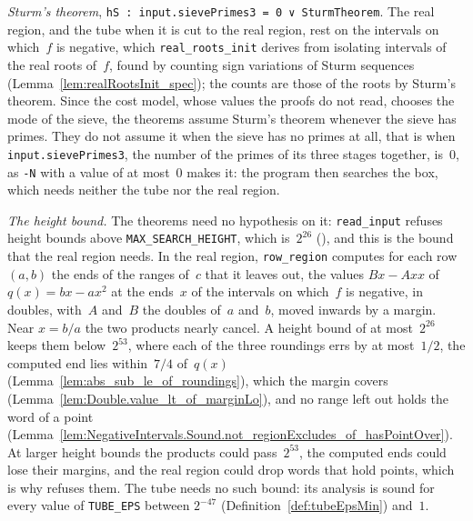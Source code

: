 \emph{Sturm's theorem}, \verb|hS : input.sievePrimes3 = 0 ∨ SturmTheorem|. The real region, and the
tube when it is cut to the real region, rest on the intervals on which~$f$ is negative, which
\texttt{real\_roots\_init} derives from isolating intervals of the real roots of~$f$, found by
counting sign variations of Sturm sequences (Lemma~\ref{lem:realRootsInit_spec}); the counts are
those of the roots by Sturm's theorem. Since the cost model, whose values the proofs do not read,
chooses the mode of the sieve, the theorems assume Sturm's theorem whenever the sieve has primes.
They do not assume it when the sieve has no primes at all, that is when \verb|input.sievePrimes3|,
the number of the primes of its three stages together, is~$0$, as \verb|-N| with a value of at
most~$0$ makes it: the program then searches the box, which needs neither the tube nor the real
region.

\emph{The height bound.} The theorems need no hypothesis on it: \texttt{read\_input} refuses height
bounds above \texttt{MAX\_SEARCH\_HEIGHT}, which is~$2^{26}$ (), and
this is the bound that the real region needs. In the real region, \texttt{row\_region} computes for
each row $(a, b)$ the ends of the ranges of~$c$ that it leaves out, the values $B x - A x x$ of
$q(x) = b x - a x^2$ at the ends~$x$ of the intervals on which~$f$ is negative, in doubles, with~$A$
and~$B$ the doubles of~$a$ and~$b$, moved inwards by a margin. Near $x = b/a$ the two products
nearly cancel. A height bound of at most~$2^{26}$ keeps them below~$2^{53}$, where each of the three
roundings errs by at most~$1/2$, the computed end lies within~$7/4$ of~$q(x)$
(Lemma~\ref{lem:abs_sub_le_of_roundings}), which the margin covers
(Lemma~\ref{lem:Double.value_lt_of_marginLo}), and no range left out holds the word of a point
(Lemma~\ref{lem:NegativeIntervals.Sound.not_regionExcludes_of_hasPointOver}). At larger height
bounds the products could pass~$2^{53}$, the computed ends could lose their margins, and the real
region could drop words that hold points, which is why \jpoints{} refuses them. The tube needs no
such bound: its analysis is sound for every value of \texttt{TUBE\_EPS} between $2^{-47}$
(Definition~\ref{def:tubeEpsMin}) and~$1$.


